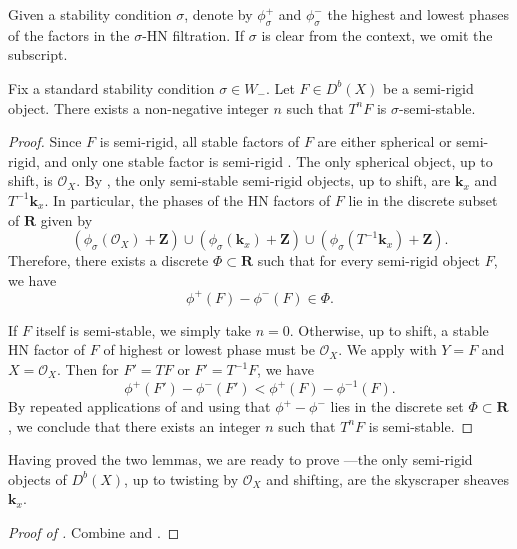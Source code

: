 \documentclass{amsart}
\begin{document}
Given a stability condition \(\sigma\), denote by \(\phi_{\sigma}^+\) and \(\phi_{\sigma}^{-}\) the highest and lowest phases of the factors in the \(\sigma\)-HN filtration.
If \(\sigma\) is clear from the context, we omit the subscript.
\begin{lemma}\label{lem:phasereduction}
  Fix a standard stability condition \(\sigma \in W_-\).
  Let \(F \in D^b(X)\) be a semi-rigid object.
  There exists a non-negative integer \(n\) such that \(T^nF\) is \(\sigma\)-semi-stable.
\end{lemma}
\begin{proof}
  Since \(F\) is semi-rigid, all stable factors of \(F\) are either spherical or semi-rigid, and only one stable factor is semi-rigid \cite[Proposition~2.9]{huy.mac.ste:08}.
  The only spherical object, up to shift, is \(\mathcal{O}_X\).
  By , the only semi-stable semi-rigid objects, up to shift, are \(\mathbf{k}_x\) and \(T^{-1} \mathbf{k}_x\).
  In particular, the phases of the HN factors of \(F\) lie in the discrete subset of \(\mathbf{R}\) given by \[\left(\phi_{\sigma}(\mathcal{O}_X) + \mathbf{Z} \right) \cup \left(\phi_{\sigma}(\mathbf{k}_x) + \mathbf{Z} \right) \cup \left(\phi_{\sigma}(T^{-1}\mathbf{k}_x) + \mathbf{Z}\right).\]
  Therefore, there exists a discrete \(\Phi \subset \mathbf{R}\) such that for every semi-rigid object \(F\), we have \[\phi^+(F) - \phi^-(F) \in \Phi.\]

  If \(F\) itself is semi-stable, we simply take \(n = 0\).
  Otherwise, up to shift, a stable HN factor of \(F\) of highest or lowest phase must be \(\mathcal{O}_X\).
  We apply \cite[Theorem~3.5]{bap.deo.lic:23} with \(Y = F\) and \(X = \mathcal{O}_X\).
  Then for \(F' = T F\) or \(F' = T^{-1} F\), we have
  \[ \phi^+(F') - \phi^-(F') < \phi^{+}(F) - \phi^{-1}(F).\]
  By repeated applications of \cite[Theorem~3.5]{bap.deo.lic:23} and using that \(\phi^+ - \phi^-\) lies in the discrete set \(\Phi \subset \mathbf{R}\), we conclude that there exists an integer \(n\) such that \(T^nF\) is semi-stable.
\end{proof}

Having proved the two lemmas, we are ready to prove ---the only semi-rigid objects of \(D^b(X)\), up to twisting by \(\mathcal{O}_X\) and shifting, are the skyscraper sheaves \(\mathbf{k}_x\).
\begin{proof}[Proof of ]
  Combine  and .
\end{proof}
\end{document}
